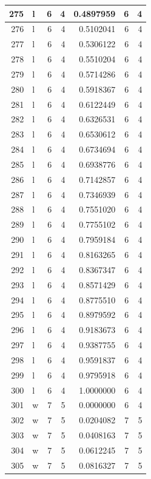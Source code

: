 \documentclass[
  letterpaper,
  DIV=11,
  numbers=noendperiod]{scrreprt}
\begin{document}
\begin{table}
\begin{tabular}[t]{r|l|r|r|r|r|r}
\hline
275 & l & 6 & 4 & 0.4897959 & 6 & 4\\
\hline
276 & l & 6 & 4 & 0.5102041 & 6 & 4\\
\hline
277 & l & 6 & 4 & 0.5306122 & 6 & 4\\
\hline
278 & l & 6 & 4 & 0.5510204 & 6 & 4\\
\hline
279 & l & 6 & 4 & 0.5714286 & 6 & 4\\
\hline
280 & l & 6 & 4 & 0.5918367 & 6 & 4\\
\hline
281 & l & 6 & 4 & 0.6122449 & 6 & 4\\
\hline
282 & l & 6 & 4 & 0.6326531 & 6 & 4\\
\hline
283 & l & 6 & 4 & 0.6530612 & 6 & 4\\
\hline
284 & l & 6 & 4 & 0.6734694 & 6 & 4\\
\hline
285 & l & 6 & 4 & 0.6938776 & 6 & 4\\
\hline
286 & l & 6 & 4 & 0.7142857 & 6 & 4\\
\hline
287 & l & 6 & 4 & 0.7346939 & 6 & 4\\
\hline
288 & l & 6 & 4 & 0.7551020 & 6 & 4\\
\hline
289 & l & 6 & 4 & 0.7755102 & 6 & 4\\
\hline
290 & l & 6 & 4 & 0.7959184 & 6 & 4\\
\hline
291 & l & 6 & 4 & 0.8163265 & 6 & 4\\
\hline
292 & l & 6 & 4 & 0.8367347 & 6 & 4\\
\hline
293 & l & 6 & 4 & 0.8571429 & 6 & 4\\
\hline
294 & l & 6 & 4 & 0.8775510 & 6 & 4\\
\hline
295 & l & 6 & 4 & 0.8979592 & 6 & 4\\
\hline
296 & l & 6 & 4 & 0.9183673 & 6 & 4\\
\hline
297 & l & 6 & 4 & 0.9387755 & 6 & 4\\
\hline
298 & l & 6 & 4 & 0.9591837 & 6 & 4\\
\hline
299 & l & 6 & 4 & 0.9795918 & 6 & 4\\
\hline
300 & l & 6 & 4 & 1.0000000 & 6 & 4\\
\hline
301 & w & 7 & 5 & 0.0000000 & 6 & 4\\
\hline
302 & w & 7 & 5 & 0.0204082 & 7 & 5\\
\hline
303 & w & 7 & 5 & 0.0408163 & 7 & 5\\
\hline
304 & w & 7 & 5 & 0.0612245 & 7 & 5\\
\hline
305 & w & 7 & 5 & 0.0816327 & 7 & 5\\

\end{tabular}
\end{table}
\end{document}
